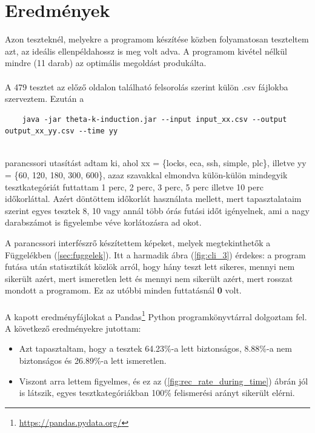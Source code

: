 \section{Eredmények}
\label{sec:kiertekeles_ered}

Azon teszteknél, melyekre a programom készítése közben folyamatosan teszteltem azt, az ideális ellenpéldahossz is meg volt adva. A programom kivétel nélkül mindre (11 darab) az optimális megoldást produkálta. 
\\
\\
A 479 tesztet az előző oldalon található felsorolás szerint külön .csv fájlokba szerveztem. Ezután a 
\ \\
\begin{lstlisting}
	java -jar theta-k-induction.jar --input input_xx.csv --output output_xx_yy.csv --time yy
\end{lstlisting}
\ \\
parancssori utasítást adtam ki, ahol xx = \{locks, eca, ssh, simple, plc\}, illetve yy = \{60, 120, 180, 300, 600\}, azaz szavakkal elmondva külön-külön mindegyik tesztkategóriát futtattam 1 perc, 2 perc, 3 perc, 5 perc illetve 10 perc időkorláttal. Azért döntöttem időkorlát használata mellett, mert tapasztalataim szerint egyes tesztek 8, 10 vagy annál több órás futási időt igényelnek, ami a nagy darabszámot is figyelembe véve korlátozásra ad okot. 

A parancssori interfészrő készítettem képeket, melyek megtekinthetők a Függelékben (\ref{sec:fuggelek}). Itt a harmadik ábra (\ref{fig:cli_3}) érdekes: a program futása után statisztikát közlök arról, hogy hány teszt lett sikeres, mennyi nem sikerült azért, mert ismeretlen lett és mennyi nem sikerült azért, mert rosszat mondott a programom. Ez az utóbbi minden futtatásnál \textbf{0} volt.
\\
\\
A kapott eredményfájlokat a Pandas\footnote{\url{https://pandas.pydata.org/}} Python programkönyvtárral dolgoztam fel. A következő eredményekre jutottam:

\begin{itemize}
	\item Azt tapasztaltam, hogy a tesztek 64.23\%-a lett biztonságos, 8.88\%-a nem biztonságos és 26.89\%-a lett ismeretlen.
	\item Viszont arra lettem figyelmes, és ez az (\ref{fig:rec_rate_during_time}) ábrán jól is látszik, egyes tesztkategóriákban 100\% felismerési arányt sikerült elérni.
\end{itemize}

